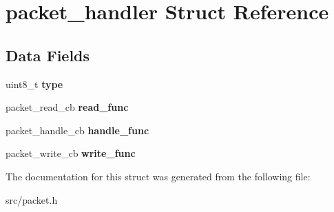 \hypertarget{structpacket__handler}{}\section{packet\+\_\+handler Struct Reference}
\label{structpacket__handler}
\subsection*{Data Fields}
\begin{DoxyCompactItemize}
\item 
\hypertarget{structpacket__handler_acda150a3844cee9928fc89d9c1e0204e}{}uint8\+\_\+t {\bfseries type}\label{structpacket__handler_acda150a3844cee9928fc89d9c1e0204e}

\item 
\hypertarget{structpacket__handler_a043987d5914119b6cb9fd322cad1731c}{}packet\+\_\+read\+\_\+cb {\bfseries read\+\_\+func}\label{structpacket__handler_a043987d5914119b6cb9fd322cad1731c}

\item 
\hypertarget{structpacket__handler_a83b542606e8c009aa6da139d5a89ed58}{}packet\+\_\+handle\+\_\+cb {\bfseries handle\+\_\+func}\label{structpacket__handler_a83b542606e8c009aa6da139d5a89ed58}

\item 
\hypertarget{structpacket__handler_a54b6b0734e245ed023ef11387ec04c66}{}packet\+\_\+write\+\_\+cb {\bfseries write\+\_\+func}\label{structpacket__handler_a54b6b0734e245ed023ef11387ec04c66}

\end{DoxyCompactItemize}


The documentation for this struct was generated from the following file\+:\begin{DoxyCompactItemize}
\item 
src/packet.\+h\end{DoxyCompactItemize}
